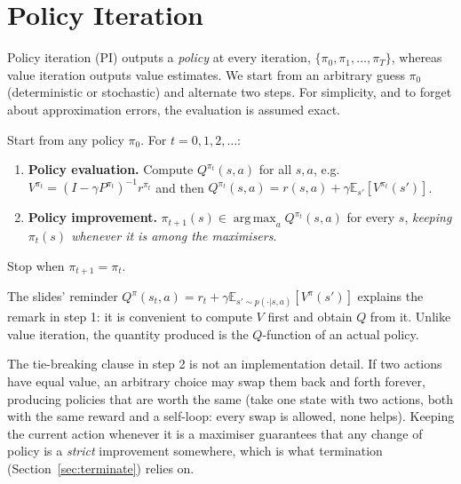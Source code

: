 \documentclass[11pt,a4paper]{article}
\newcommand{\E}{\mathbb{E}}
\DeclareMathOperator*{\argmax}{arg\,max}
\theoremstyle{plain}
\theoremstyle{definition}
\theoremstyle{remark}
\begin{document}
\section{Policy Iteration}
Policy iteration (PI) outputs a \emph{policy} at every iteration, $\{\pi_0,\pi_1,\dots,\pi_T\}$, whereas value iteration outputs value estimates. We start from an arbitrary guess $\pi_0$ (deterministic or stochastic) and alternate two steps. For simplicity, and to forget about approximation errors, the evaluation is assumed exact.

\begin{algo}\label{alg:pi}
Start from any policy $\pi_0$. For $t=0,1,2,\dots$:
\begin{enumerate}[leftmargin=2.2em,itemsep=2pt]
\item \textbf{Policy evaluation.} Compute $Q^{\pi_t}(s,a)$ for all $s,a$, e.g. $V^{\pi_t}=(I-\gamma P^{\pi_t})^{-1}r^{\pi_t}$ and then $Q^{\pi_t}(s,a)=r(s,a)+\gamma\E_{s'}[V^{\pi_t}(s')]$.
\item \textbf{Policy improvement.} $\pi_{t+1}(s)\in\argmax_aQ^{\pi_t}(s,a)$ for every $s$, \emph{keeping $\pi_t(s)$ whenever it is among the maximisers}.
\end{enumerate}
Stop when $\pi_{t+1}=\pi_t$.
\end{algo}

The slides' reminder $Q^\pi(s_t,a)=r_t+\gamma\E_{s'\sim p(\cdot|s,a)}[V^\pi(s')]$ explains the remark in step 1: it is convenient to compute $V$ first and obtain $Q$ from it. Unlike value iteration, the quantity produced is the $Q$-function of an actual policy.

\begin{intuition}
The tie-breaking clause in step 2 is not an implementation detail. If two actions have equal value, an arbitrary choice may swap them back and forth forever, producing policies that are worth the same (take one state with two actions, both with the same reward and a self-loop: every swap is allowed, none helps). Keeping the current action whenever it is a maximiser guarantees that any change of policy is a \emph{strict} improvement somewhere, which is what termination (Section~\ref{sec:terminate}) relies on.
\end{intuition}
\end{document}
